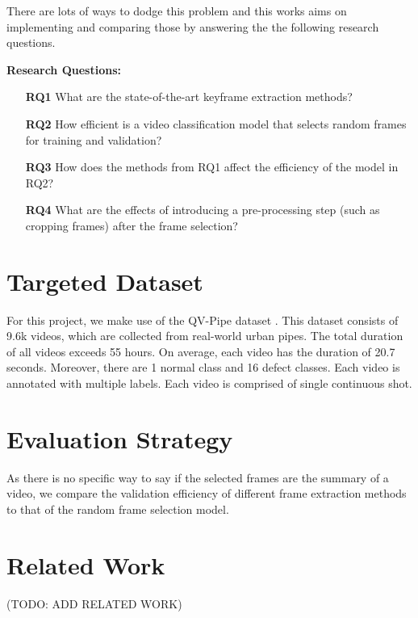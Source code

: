 \documentclass[rnd]{mas_proposal}
\begin{document}
There are lots of ways to dodge this problem and this works aims on implementing and comparing those by answering the the following research questions.

\textbf{Research Questions:}

\begin{itemize}
    \setlength{\itemindent}{3em}
    \item[\textbf{RQ1}] What are the state-of-the-art keyframe extraction methods?
    \item[\textbf{RQ2}] How efficient is a video classification model that selects random frames for training and validation?
    \item[\textbf{RQ3}] How does the methods from RQ1 affect the efficiency of the model in RQ2?
    \item[\textbf{RQ4}] What are the effects of introducing a pre-processing step (such as cropping frames) after the frame selection?
\end{itemize}

\section{Targeted Dataset}

For this project, we make use of the QV-Pipe dataset \cite{Liu2022}. This dataset consists of 9.6k videos, which are collected from real-world urban pipes. The total duration of all videos exceeds 55 hours. On average, each video has the duration of 20.7 seconds. Moreover, there are 1 normal class and 16 defect classes. Each video is annotated with multiple labels. Each video is comprised of single continuous shot.

\section{Evaluation Strategy}

As there is no specific way to say if the selected frames are the summary of a video, we compare the validation efficiency of different frame extraction methods to that of the random frame selection model.

\section{Related Work}

(TODO: ADD RELATED WORK)
\end{document}
